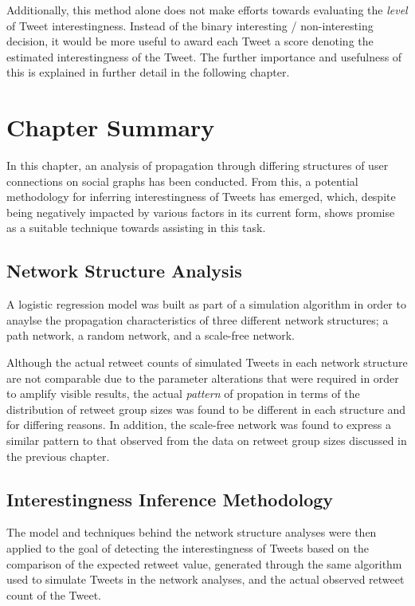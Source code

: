 Additionally, this method alone does not make efforts towards evaluating the \textit{level} of Tweet interestingness. Instead of the binary interesting / non-interesting decision, it would be more useful to award each Tweet a score denoting the estimated interestingness of the Tweet. The further importance and usefulness of this is explained in further detail in the following chapter.


\section{Chapter Summary}
In this chapter, an analysis of propagation through differing structures of user connections on social graphs has been conducted. From this, a potential methodology for inferring interestingness of Tweets has emerged, which, despite being negatively impacted by various factors in its current form, shows promise as a suitable technique towards assisting in this task.


\subsection{Network Structure Analysis}
A logistic regression model was built as part of a simulation algorithm in order to anaylse the propagation characteristics of three different network structures; a path network, a random network, and a scale-free network. 

Although the actual retweet counts of simulated Tweets in each network structure are not comparable due to the parameter alterations that were required in order to amplify visible results, the actual \textit{pattern} of propation in terms of the distribution of retweet group sizes was found to be different in each structure and for differing reasons. In addition, the scale-free network was found to express a similar pattern to that observed from the data on retweet group sizes discussed in the previous chapter.


\subsection{Interestingness Inference Methodology}
The model and techniques behind the network structure analyses were then applied to the goal of detecting the interestingness of Tweets based on the comparison of the expected retweet value, generated through the same algorithm used to simulate Tweets in the network analyses, and the actual observed retweet count of the Tweet.

